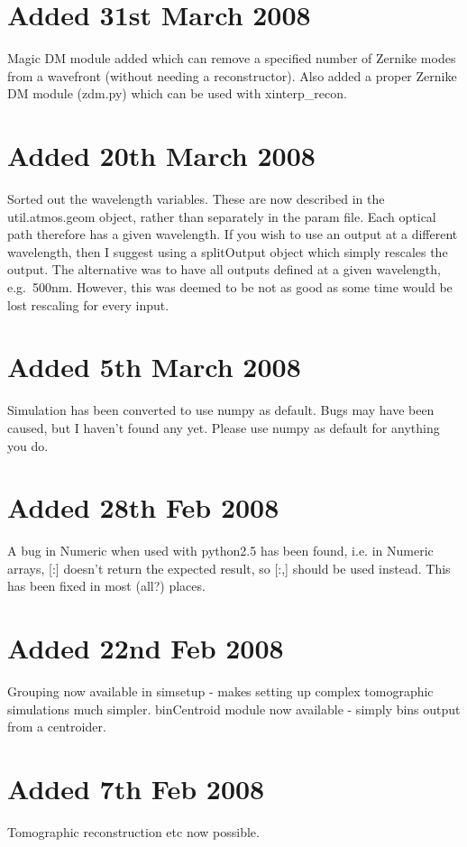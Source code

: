 \documentclass{article}
\begin{document}
\section{Added 31st March 2008}
Magic DM module added which can remove a specified number of Zernike
modes from a wavefront (without needing a reconstructor).
Also added a proper Zernike DM module (zdm.py) which can be used with
xinterp\_recon.


\section{Added 20th March 2008}
Sorted out the wavelength variables.  These are now described in the
util.atmos.geom object, rather than separately in the param file.
Each optical path therefore has a given wavelength.  If you wish to
use an output at a different wavelength, then I suggest using a
splitOutput object which simply rescales the output.  The alternative
was to have all outputs defined at a given wavelength, e.g.\ 500nm.
However, this was deemed to be not as good as some time would be lost
rescaling for every input.

\section{Added 5th March 2008}
Simulation has been converted to use numpy as default.  Bugs may have
been caused, but I haven't found any yet.  Please use numpy as default
for anything you do.

\section{Added 28th Feb 2008}
A bug in Numeric when used with python2.5 has been found, i.e. in
Numeric arrays, [:] doesn't return the expected result, so [:,] should
be used instead.  This has been fixed in most (all?) places.

\section{Added 22nd Feb 2008}
Grouping now available in simsetup - makes setting up complex
tomographic simulations much simpler.
binCentroid module now available - simply bins output from a
centroider.


\section{Added 7th Feb 2008}
Tomographic reconstruction etc now possible.
\end{document}
